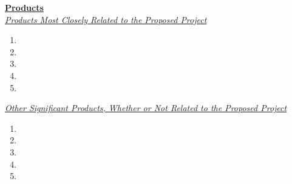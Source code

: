 \documentclass[11pt]{article}
\begin{document}
\noindent
{\bf \underline{Products}} \\
{\em \underline{Products Most Closely Related to the Proposed Project}}
\begin{enumerate}
\item
{}
\item
{}
\item
{}
\item
{}
\item
{}
\end{enumerate}

\noindent
{\em \underline{Other Significant Products, Whether or Not Related to the Proposed Project}}
\begin{enumerate}
\item
{}
\item
{}
\item
{}
\item
{}
\item
{}
\end{enumerate}
\end{document}
